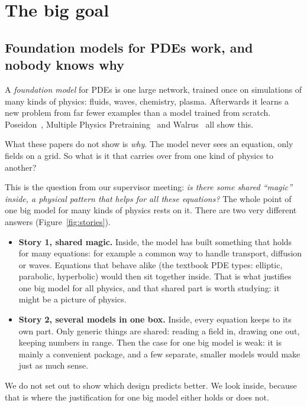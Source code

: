 \documentclass[11pt,a4paper]{article}
\begin{document}
\newpage
\section{The big goal}

\subsection{Foundation models for PDEs work, and nobody knows why}

A \emph{foundation model} for PDEs is one large network, trained once on simulations of many kinds of physics:
fluids, waves, chemistry, plasma. Afterwards it learns a new problem from far fewer examples than a model trained from scratch.
Poseidon~\cite{poseidon}, Multiple Physics Pretraining~\cite{mpp} and Walrus~\cite{walrus} all show this.

What these papers do not show is \emph{why}. The model never sees an equation, only fields on a grid.
So what is it that carries over from one kind of physics to another?

This is the question from our supervisor meeting: \emph{is there some shared ``magic'' inside, a physical pattern that helps
for all these equations?} The whole point of one big model for many kinds of physics rests on it.
There are two very different answers (Figure~\ref{fig:stories}).

\begin{itemize}[itemsep=0.7em]
  \item \textbf{Story 1, shared magic.} Inside, the model has built something that holds for many equations:
  for example a common way to handle transport, diffusion or waves. Equations that behave alike
  (the textbook PDE types: elliptic, parabolic, hyperbolic) would then sit together inside.
  That is what justifies one big model for all physics, and that shared part is worth studying: it might be a picture of physics.
  \item \textbf{Story 2, several models in one box.} Inside, every equation keeps to its own part.
  Only generic things are shared: reading a field in, drawing one out, keeping numbers in range.
  Then the case for one big model is weak: it is mainly a convenient package,
  and a few separate, smaller models would make just as much sense.
\end{itemize}

We do not set out to show which design predicts better. We look inside, because that is where the justification for one big model either holds or does not.
\end{document}
